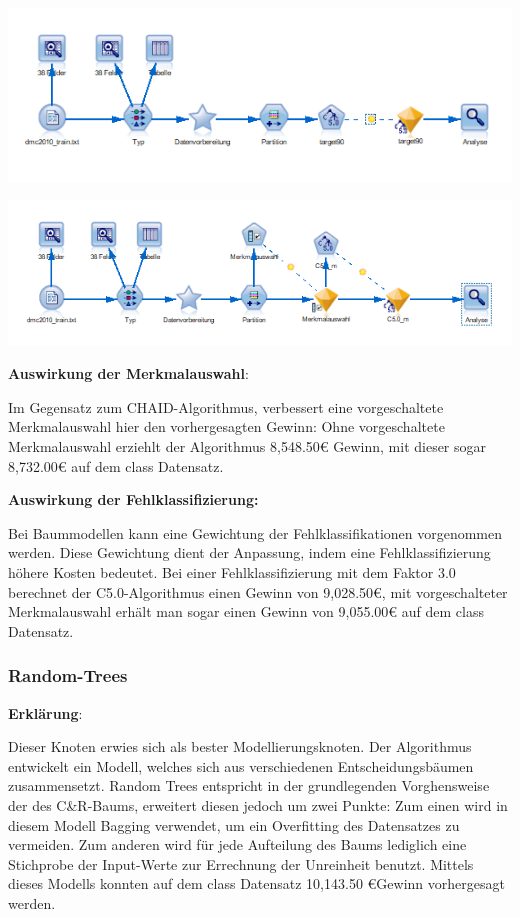 \documentclass[a4paper,12pt]{article}
\newcounter{Algorithmus}
\begin{document}
\begin{center}
\includegraphics[width=\textwidth]{Screens/c50}
\end{center}

\begin{center}
\includegraphics[width=\textwidth]{Screens/c50_m}
\end{center}

{\bf Auswirkung der Merkmalauswahl}:
\par
Im Gegensatz zum CHAID-Algorithmus, verbessert eine vorgeschaltete Merkmalauswahl hier den vorhergesagten Gewinn: Ohne vorgeschaltete Merkmalauswahl erziehlt der Algorithmus 8,548.50\;\euro\; Gewinn, mit dieser sogar 8,732.00\;\euro\; auf dem class Datensatz.
\par
\vspace{0.2cm}

{\bf Auswirkung der Fehlklassifizierung:}
\par
Bei Baummodellen kann eine Gewichtung der Fehlklassifikationen vorgenommen werden. Diese
Gewichtung dient der Anpassung, indem eine Fehlklassifizierung höhere
Kosten bedeutet. Bei einer Fehlklassifizierung mit dem Faktor 3.0 berechnet der C5.0-Algorithmus einen Gewinn von 9,028.50\;\euro,\; mit vorgeschalteter Merkmalauswahl erhält man sogar einen Gewinn von 9,055.00\;\euro\; auf dem class Datensatz.

\subsubsection{Random-Trees}
{\bf Erklärung}:
\par
\vspace{0.2cm}
Dieser Knoten erwies sich als bester Modellierungsknoten.
Der Algorithmus entwickelt ein Modell, welches sich aus verschiedenen Entscheidungsbäumen zusammensetzt.
Random Trees entspricht in der grundlegenden Vorghensweise der des C\&R-Baums, erweitert
diesen jedoch um zwei Punkte: Zum einen wird in diesem Modell Bagging verwendet, um
ein Overfitting des Datensatzes zu vermeiden. Zum anderen wird für jede Aufteilung des Baums
lediglich eine Stichprobe der Input-Werte zur Errechnung der Unreinheit benutzt.
Mittels dieses Modells konnten auf dem class Datensatz 10,143.50 \euro  Gewinn vorhergesagt werden.
\end{document}
